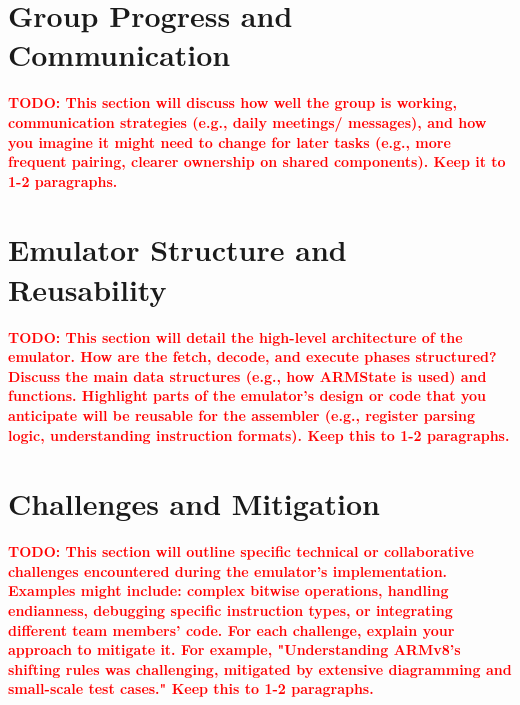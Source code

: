 \documentclass[11pt,a4paper]{article} %
\newcommand{\todo}[1]{\textcolor{red}{\textbf{TODO: #1}}}
\begin{document}
\section{Group Progress and Communication}
\label{sec:group-progress}
\todo{This section will discuss how well the group is working, communication strategies (e.g., daily meetings/ messages), and how you imagine it might need to change for later tasks (e.g., more frequent pairing, clearer ownership on shared components). Keep it to 1-2 paragraphs.}

\section{Emulator Structure and Reusability}
\label{sec:emulator-structure}
\todo{This section will detail the high-level architecture of the emulator. How are the fetch, decode, and execute phases structured? Discuss the main data structures (e.g., how ARMState is used) and functions. Highlight parts of the emulator's design or code that you anticipate will be reusable for the assembler (e.g., register parsing logic, understanding instruction formats). Keep this to 1-2 paragraphs.}

\section{Challenges and Mitigation}
\label{sec:challenges}
\todo{This section will outline specific technical or collaborative challenges encountered during the emulator's implementation. Examples might include: complex bitwise operations, handling endianness, debugging specific instruction types, or integrating different team members' code. For each challenge, explain your approach to mitigate it. For example, "Understanding ARMv8's shifting rules was challenging, mitigated by extensive diagramming and small-scale test cases." Keep this to 1-2 paragraphs.}
\end{document}
